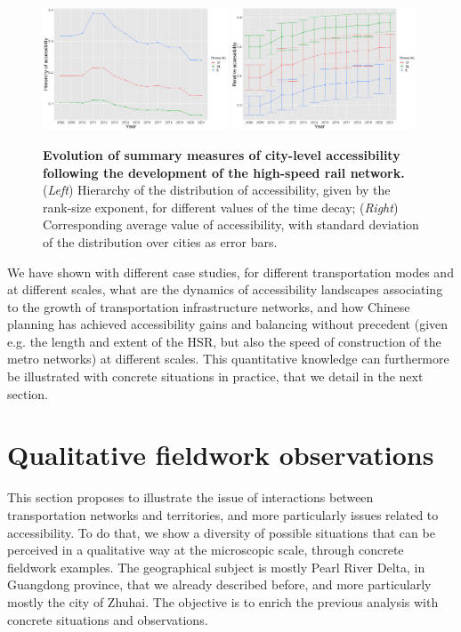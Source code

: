 \begin{figure}
	\includegraphics[width=0.49\textwidth]{figures/access_hierarchy.png}
	\includegraphics[width=0.49\textwidth]{figures/access_summary.png}
	\caption{\textbf{Evolution of summary measures of city-level accessibility following the development of the high-speed rail network.} (\textit{Left}) Hierarchy of the distribution of accessibility, given by the rank-size exponent, for different values of the time decay; (\textit{Right}) Corresponding average value of accessibility, with standard deviation of the distribution over cities as error bars.\label{fig:hsraccess}}
\end{figure}

We have shown with different case studies, for different transportation modes and at different scales, what are the dynamics of accessibility landscapes associating to the growth of transportation infrastructure networks, and how Chinese planning has achieved accessibility gains and balancing without precedent (given e.g. the length and extent of the HSR, but also the speed of construction of the metro networks) at different scales. This quantitative knowledge can furthermore be illustrated with concrete situations in practice, that we detail in the next section.


\section{Qualitative fieldwork observations}


This section proposes to illustrate the issue of interactions between transportation networks and territories, and more particularly issues related to accessibility. To do that, we show a diversity of possible situations that can be perceived in a qualitative way at the microscopic scale, through concrete fieldwork examples. The geographical subject is mostly Pearl River Delta, in Guangdong province, that we already described before, and more particularly mostly the city of Zhuhai. The objective is to enrich the previous analysis with concrete situations and observations.


